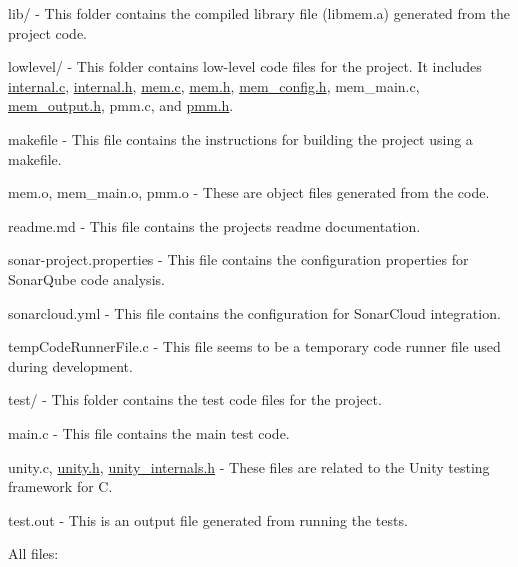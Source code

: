 \begin{DoxyItemize}
\item {\ttfamily lib/} -\/ This folder contains the compiled library file ({\ttfamily libmem.\+a}) generated from the project code.
\item {\ttfamily lowlevel/} -\/ This folder contains low-\/level code files for the project. It includes {\ttfamily \mbox{\hyperlink{internal_8c}{internal.\+c}}}, {\ttfamily \mbox{\hyperlink{internal_8h}{internal.\+h}}}, {\ttfamily \mbox{\hyperlink{mem_8c}{mem.\+c}}}, {\ttfamily \mbox{\hyperlink{mem_8h}{mem.\+h}}}, {\ttfamily \mbox{\hyperlink{mem__config_8h}{mem\+\_\+config.\+h}}}, {\ttfamily mem\+\_\+main.\+c}, {\ttfamily \mbox{\hyperlink{mem__output_8h}{mem\+\_\+output.\+h}}}, {\ttfamily pmm.\+c}, and {\ttfamily \mbox{\hyperlink{pmm_8h_source}{pmm.\+h}}}.
\item {\ttfamily makefile} -\/ This file contains the instructions for building the project using a makefile.
\item {\ttfamily mem.\+o}, {\ttfamily mem\+\_\+main.\+o}, {\ttfamily pmm.\+o} -\/ These are object files generated from the code.
\item {\ttfamily readme.\+md} -\/ This file contains the project\textquotesingle{}s readme documentation.
\item {\ttfamily sonar-\/project.\+properties} -\/ This file contains the configuration properties for Sonar\+Qube code analysis.
\item {\ttfamily sonarcloud.\+yml} -\/ This file contains the configuration for Sonar\+Cloud integration.
\item {\ttfamily temp\+Code\+Runner\+File.\+c} -\/ This file seems to be a temporary code runner file used during development.
\item {\ttfamily test/} -\/ This folder contains the test code files for the project.
\begin{DoxyItemize}
\item {\ttfamily main.\+c} -\/ This file contains the main test code.
\item {\ttfamily unity.\+c}, {\ttfamily \mbox{\hyperlink{unity_8h_source}{unity.\+h}}}, {\ttfamily \mbox{\hyperlink{unity__internals_8h_source}{unity\+\_\+internals.\+h}}} -\/ These files are related to the Unity testing framework for C.
\end{DoxyItemize}
\item {\ttfamily test.\+out} -\/ This is an output file generated from running the tests.
\end{DoxyItemize}

All files\+:

